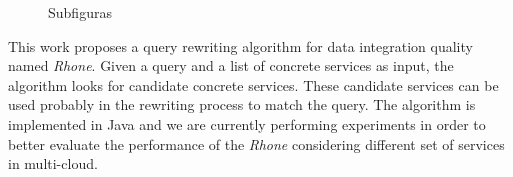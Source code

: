 \documentclass{sig-alternate}
\begin{document}
\begin{figure}[!htb]
\centering
{}
\quad %
\caption{Subfiguras}
\label{fig01}
\end{figure}
%
%

This work proposes a query rewriting algorithm for data integration quality
named \textit{Rhone}. Given a query and a list of concrete services as input,
the algorithm looks for candidate concrete services. These candidate services can be used probably in the rewriting
process to match the query. The algorithm is implemented in Java and we are
currently performing experiments in order to better evaluate the performance of
the \textit{Rhone} considering different set of services in multi-cloud.
\end{document}
